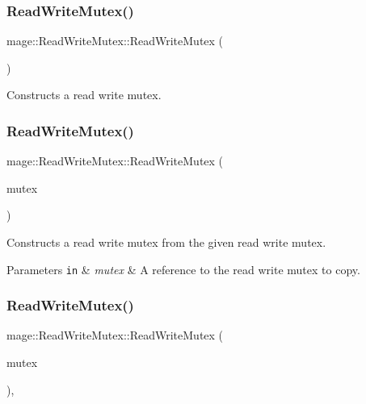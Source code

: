 \subsubsection{\texorpdfstring{Read\+Write\+Mutex()}{ReadWriteMutex()}\hspace{0.1cm}{\footnotesize\ttfamily [1/3]}}
{\footnotesize\ttfamily mage\+::\+Read\+Write\+Mutex\+::\+Read\+Write\+Mutex (\begin{DoxyParamCaption}{ }\end{DoxyParamCaption})\hspace{0.3cm}{\ttfamily [noexcept]}}

Constructs a read write mutex. \hypertarget{classmage_1_1_read_write_mutex_aacb2f69e7e2b084147e1e45628e9dd67}{}\label{classmage_1_1_read_write_mutex_aacb2f69e7e2b084147e1e45628e9dd67} 
\subsubsection{\texorpdfstring{Read\+Write\+Mutex()}{ReadWriteMutex()}\hspace{0.1cm}{\footnotesize\ttfamily [2/3]}}
{\footnotesize\ttfamily mage\+::\+Read\+Write\+Mutex\+::\+Read\+Write\+Mutex (\begin{DoxyParamCaption}\item[{const \hyperlink{classmage_1_1_read_write_mutex}{Read\+Write\+Mutex} \&}]{mutex }\end{DoxyParamCaption})\hspace{0.3cm}{\ttfamily [delete]}}

Constructs a read write mutex from the given read write mutex.


\begin{DoxyParams}[1]{Parameters}
\mbox{\tt in}  & {\em mutex} & A reference to the read write mutex to copy. \\
\hline
\end{DoxyParams}
\hypertarget{classmage_1_1_read_write_mutex_a35e15c17527ef771920129c4e381eb17}{}\label{classmage_1_1_read_write_mutex_a35e15c17527ef771920129c4e381eb17} 
\subsubsection{\texorpdfstring{Read\+Write\+Mutex()}{ReadWriteMutex()}\hspace{0.1cm}{\footnotesize\ttfamily [3/3]}}
{\footnotesize\ttfamily mage\+::\+Read\+Write\+Mutex\+::\+Read\+Write\+Mutex (\begin{DoxyParamCaption}\item[{\hyperlink{classmage_1_1_read_write_mutex}{Read\+Write\+Mutex} \&\&}]{mutex }\end{DoxyParamCaption})\hspace{0.3cm}{\ttfamily [default]}, {\ttfamily [noexcept]}}

